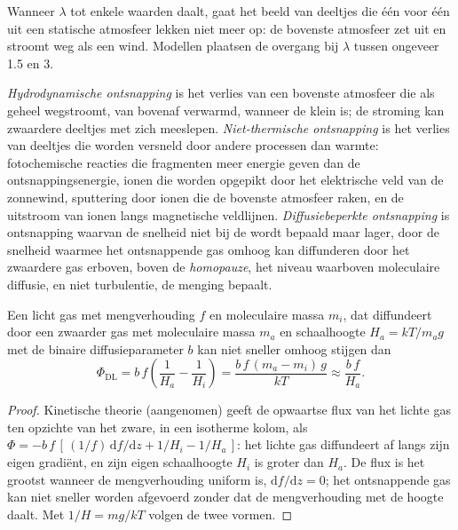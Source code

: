 
Wanneer $\lambda$ tot enkele waarden daalt, gaat het beeld van deeltjes die één voor één
uit een statische atmosfeer lekken niet meer op: de bovenste atmosfeer zet uit en stroomt
weg als een wind. Modellen plaatsen de overgang bij $\lambda$ tussen ongeveer 1.5
en 3.

\begin{definition}\label{def:b3:planetary-atmospheres:hydrodynamic}
\emph{Hydrodynamische ontsnapping} is het verlies van een
bovenste atmosfeer die als geheel wegstroomt, van bovenaf verwarmd, wanneer de
 klein is; de stroming kan zwaardere deeltjes met zich meeslepen.
\emph{Niet-thermische ontsnapping} is het verlies van
deeltjes die worden versneld door andere processen dan warmte: fotochemische
reacties die fragmenten meer energie geven dan de ontsnappingsenergie, ionen die worden opgepikt
door het elektrische veld van de zonnewind, sputtering door ionen die
de bovenste atmosfeer raken, en de uitstroom van ionen langs magnetische veldlijnen.
\emph{Diffusiebeperkte ontsnapping} is ontsnapping
waarvan de snelheid niet bij de  wordt bepaald maar lager, door de snelheid waarmee
het ontsnappende gas omhoog kan diffunderen door het zwaardere gas erboven, boven de
\emph{homopauze}, het niveau waarboven moleculaire
diffusie, en niet turbulentie, de menging bepaalt.
\end{definition}

\begin{proposition}[Diffusielimiet]\label{prop:b3:planetary-atmospheres:diffusion}
Een licht gas met mengverhouding $f$ en moleculaire massa $m_i$, dat diffundeert
door een zwaarder gas met moleculaire massa $m_a$ en schaalhoogte $H_a =
kT/m_a g$ met de binaire diffusieparameter $b$ kan niet sneller omhoog
stijgen dan
\[
\Phi_\mathrm{DL} = b\,f\left(\frac1{H_a} - \frac1{H_i}\right)
= \frac{b\,f\,(m_a - m_i)\,g}{kT} \approx \frac{b\,f}{H_a}.
\]
\end{proposition}

\begin{proof}
Kinetische theorie (aangenomen) geeft de opwaartse flux van het lichte gas
ten opzichte van het zware, in een isotherme kolom, als $\Phi = -b\,f\,
[\,(1/f)\,\mathrm df/\mathrm dz + 1/H_i - 1/H_a\,]$: het lichte gas
diffundeert af langs zijn eigen gradiënt, en zijn eigen schaalhoogte $H_i$ is groter
dan $H_a$. De flux is het grootst wanneer de mengverhouding uniform is, $\mathrm
df/\mathrm dz = 0$; het ontsnappende gas kan niet sneller worden afgevoerd zonder dat
de mengverhouding met de hoogte daalt. Met $1/H = mg/kT$ volgen de
twee vormen.
\end{proof}


